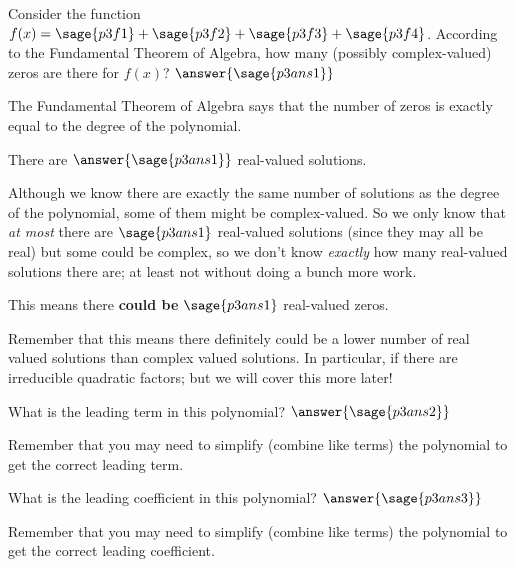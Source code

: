 \documentclass{ximera}
\begin{document}
\begin{problem}
Consider the function $f(x) = \sage{p3f1} + \sage{p3f2} + \sage{p3f3} + \sage{p3f4}$. According to the Fundamental Theorem of Algebra, how many (possibly complex-valued) zeros are there for $f(x)$? $\answer{\sage{p3ans1}}$
    \begin{feedback}
        The Fundamental Theorem of Algebra says that the number of zeros is exactly equal to the degree of the polynomial.
    \end{feedback}
    
    \begin{problem}
        There are  $\answer{\sage{p3ans1}}$ real-valued solutions. 
        \begin{feedback}[correct]
            Although we know there are exactly the same number of solutions as the degree of the polynomial, some of them might be complex-valued. So we only know that \textit{at most} there are $\sage{p3ans1}$ real-valued solutions (since they may all be real) but some could be complex, so we don't know \textit{exactly} how many real-valued solutions there are; at least not without doing a bunch more work.
        \end{feedback}
        
        \begin{problem}
            This means there \textbf{could be}  $\sage{p3ans1}$ real-valued zeros.
            \begin{feedback}[correct]
                Remember that this means there definitely could be a lower number of real valued solutions than complex valued solutions. In particular, if there are irreducible quadratic factors; but we will cover this more later!
            \end{feedback}
            
        \end{problem}
    \end{problem}
    \begin{problem}
        What is the leading term in this polynomial? $\answer{\sage{p3ans2}}$
        \begin{feedback}
            Remember that you may need to simplify (combine like terms) the polynomial to get the correct leading term.
        \end{feedback}
    \end{problem}
    \begin{problem}
        What is the leading coefficient in this polynomial? $\answer{\sage{p3ans3}}$
        \begin{feedback}
            Remember that you may need to simplify (combine like terms) the polynomial to get the correct leading coefficient.
        \end{feedback}
    \end{problem}
    
\end{problem}
\end{document}
